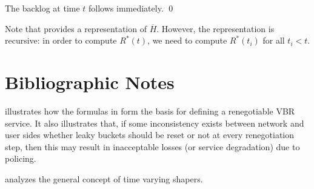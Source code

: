 The backlog at time $t$ follows immediately. \qed

Note that  provides a representation of
$\overline{H}$. However, the representation is recursive: in order
to compute $R^*(t)$, we need to compute $R^*(t_i)$ for all $t_i <
t$.


\section{Bibliographic Notes}
\cite{Gioleb} illustrates how the formulas in  form
the basis for defining a renegotiable VBR service. It also
illustrates that, if some inconsistency exists between network and
user sides whether leaky buckets should be reset or not at every
renegotiation step, then this may result in inacceptable losses
(or service degradation) due to policing.

 \cite{changCruz98} analyzes the general concept of time varying
 shapers.
